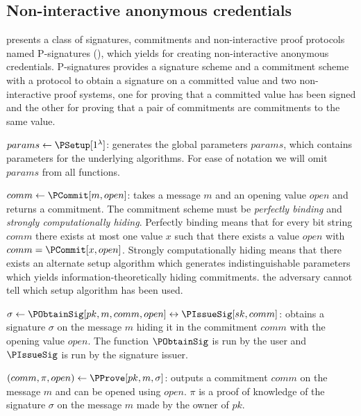 \subsection{Non-interactive anonymous credentials}%
\label{NIZK-anon-cred}


 presents a class of signatures, commitments and 
non-interactive proof protocols named P-signatures (\Psig), which yields for 
creating non-interactive anonymous credentials.
P-signatures provides a signature scheme and a commitment scheme with a protocol 
to obtain a signature on a committed value and two non-interactive proof 
systems, one for proving that a committed value has been signed and the other 
for proving that a pair of commitments are commitments to the same value.


\(params\gets \PSetup[1^\lambda]\): generates the global parameters \(params\), 
which contains parameters for the underlying algorithms.
For ease of notation we will omit \(params\) from all functions.


\(comm\gets \PCommit[m, open]\): takes a message \(m\) and an opening value 
\(open\) and returns a commitment.
The commitment scheme must be \emph{perfectly binding} and \emph{strongly 
  computationally hiding}.
Perfectly binding means that for every bit string \(comm\) there exists at most 
one value \(x\) such that there exists a value \(open\) with \(comm = 
  \PCommit[x, open]\).
Strongly computationally hiding means that there exists an alternate setup 
algorithm which generates indistinguishable parameters which yields 
information-theoretically hiding commitments.
\Ie the adversary cannot tell which setup algorithm has been used.


\(\sigma\gets \PObtainSig[pk, m, comm, open]\leftrightarrow
  \PIssueSig[sk, comm]\): obtains a signature \(\sigma\) on the message 
\(m\) hiding it in the commitment \(comm\) with the opening value \(open\).
The function \(\PObtainSig\) is run by the user and \(\PIssueSig\) is run by the 
signature issuer.


\((comm, \pi, open)\gets \PProve[pk, m, \sigma]\): outputs a commitment 
\(comm\) on the message \(m\) and can be opened using \(open\).
\(\pi\) is a proof of knowledge of the signature \(\sigma\) on the message \(m\) 
made by the owner of \(pk\).

